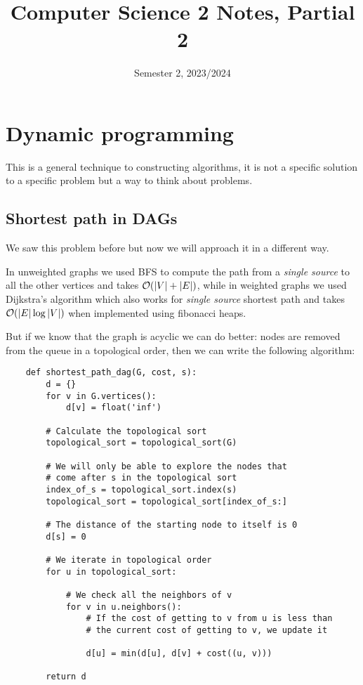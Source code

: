 \documentclass[12pt]{extarticle}
\title{Computer Science 2 Notes, Partial 2}
\date{Semester 2, 2023/2024}
\begin{document}
\maketitle
\tableofcontents
\clearpage

\section{Dynamic programming}

This is a general technique to constructing algorithms, it is not a specific solution to a specific problem but a way to think about problems.

\subsection{Shortest path in DAGs}

We saw this problem before but now we will approach it in a different way.

In unweighted graphs we used BFS to compute the path from a \textit{single source} to all the other vertices and takes $\mathcal{O}(|V| + |E|)$, while in weighted graphs we used Dijkstra's algorithm which also works for \textit{single source} shortest path and takes $\mathcal{O}(|E| \log |V|)$ when implemented using fibonacci heaps.

But if we know that the graph is acyclic we can do better: nodes are removed from the queue in a topological order, then we can write the following algorithm:

\begin{verbatim}
    def shortest_path_dag(G, cost, s):
        d = {}
        for v in G.vertices():
            d[v] = float('inf')

        # Calculate the topological sort
        topological_sort = topological_sort(G)

        # We will only be able to explore the nodes that
        # come after s in the topological sort
        index_of_s = topological_sort.index(s)
        topological_sort = topological_sort[index_of_s:]

        # The distance of the starting node to itself is 0
        d[s] = 0

        # We iterate in topological order
        for u in topological_sort:

            # We check all the neighbors of v
            for v in u.neighbors():
                # If the cost of getting to v from u is less than
                # the current cost of getting to v, we update it
                
                d[u] = min(d[u], d[v] + cost((u, v)))

        return d
\end{verbatim}
\end{document}
